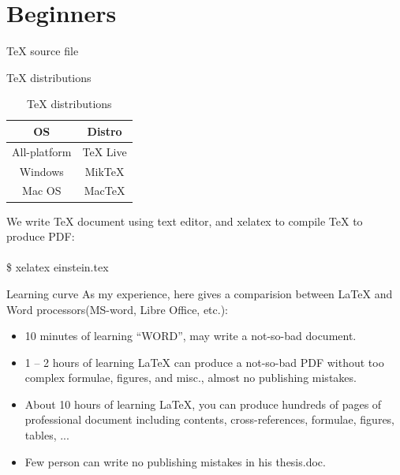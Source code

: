 \documentclass[10pt]{beamer}
\begin{document}
\section{Beginners}
\begin{frame}{\TeX{} source file}

\end{frame}

\begin{frame}{\TeX{} distributions}
\begin{table}
\centering
    \caption{\TeX{} distributions}
    \begin{tabular}{cc}\hline\hline
        OS          &   Distro\\\hline
        All-platform & TeX Live\\
        Windows    & MikTeX \\
        Mac OS    & MacTeX\\\hline
    \end{tabular}
\end{table}

    We write \TeX{} document using text editor, and xelatex to compile
    \TeX{} to produce PDF:
   \\ ~ \\

   \qquad \$ xelatex einstein.tex

\end{frame}

\begin{frame}{Learning curve}
    As my experience, here gives a comparision between 
    \LaTeX{} and Word processors(MS-word, Libre Office, etc.):
\begin{itemize}
    \item 10 minutes of learning ``WORD'', may write a not-so-bad document.
    \item 1 -- 2 hours of learning \LaTeX{} can produce a not-so-bad
        PDF without too complex formulae, figures, and misc., almost
        no publishing mistakes.
    \item About 10 hours of learning \LaTeX{}, you can produce hundreds
        of pages of professional document including contents,
        cross-references, formulae, figures, tables, ...
    \item Few person can write no publishing mistakes in his thesis.doc.
\end{itemize}
\end{frame}
\end{document}
